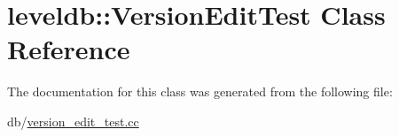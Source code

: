 \hypertarget{classleveldb_1_1_version_edit_test}{\section{leveldb\-:\-:Version\-Edit\-Test Class Reference}
\label{classleveldb_1_1_version_edit_test}
}


The documentation for this class was generated from the following file\-:\begin{DoxyCompactItemize}
\item 
db/\hyperlink{version__edit__test_8cc}{version\-\_\-edit\-\_\-test.\-cc}\end{DoxyCompactItemize}
